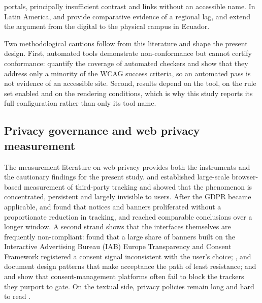 \documentclass[pdflatex,sn-basic,Numbered,iicol]{sn-jnl}
\theoremstyle{thmstyleone}
\theoremstyle{thmstyletwo}
\theoremstyle{thmstylethree}
\begin{document}
portals, principally insufficient contrast and links without an accessible name. In Latin America, \citet{acostavargas2020dataset} and \citet{acostavargas2020improve} provide comparative evidence of a regional lag, and \citet{maldonadogarces2025physical} extend the argument from the digital to the physical campus in Ecuador.
	
	Two methodological cautions follow from this literature and shape the present design. First, automated tools demonstrate non-conformance but cannot certify conformance: \citet{fischer2025coverage} quantify the coverage of automated checkers and show that they address only a minority of the WCAG success criteria, so an automated pass is not evidence of an accessible site. Second, results depend on the tool, on the rule set enabled and on the rendering conditions, which is why this study reports its full configuration rather than only its tool name.
	
	\subsection{Privacy governance and web privacy measurement}\label{sec:related-privacy}
	
	The measurement literature on web privacy provides both the instruments and the cautionary findings for the present study. \citet{libert2015exposing} and \citet{englehardt2016online} established large-scale browser-based measurement of third-party tracking and showed that the phenomenon is concentrated, persistent and largely invisible to users. After the GDPR became applicable, \citet{degeling2019value} and \citet{trevisan2019four} found that notices and banners proliferated without a proportionate reduction in tracking, and \citet{kretschmer2021cookie} reached comparable conclusions over a longer window. A second strand shows that the interfaces themselves are frequently non-compliant: \citet{matte2020cookie} found that a large share of banners built on the Interactive Advertising Bureau (IAB) Europe Transparency and Consent Framework registered a consent signal inconsistent with the user's choice; \citet{nouwens2020dark}, \citet{gray2021dark} and \citet{habib2022okay} document design patterns that make acceptance the path of least resistance; and \citet{sanchezrola2019can} and \citet{bollinger2022automating} show that consent-management platforms often fail to block the trackers they purport to gate. On the textual side, privacy policies remain long and hard to read \citep{fabian2017largescale,belcheva2023understanding}.
	
\end{document}
